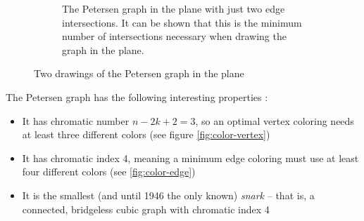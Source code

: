 \documentclass[12pt,            %
               a4paper,         %
               oneside,         %
               DIV12,           %
               fleqn,           %
               halfparskip,     %
               nochapterprefix, %
               bibtotocnumbered,%
              ]{scrartcl} %
\theoremstyle{definition}
\begin{document}
\begin{figure}[p]
\begin{subfigure}[t]{.45\textwidth}
    \caption{The Petersen graph in the plane with just two edge
      intersections. It can be shown that this is the minimum number of
      intersections necessary when drawing the graph in the plane.}
    \label{fig:petersen-twointersect}
  \end{subfigure}
  \caption{Two drawings of the Petersen graph in the plane}
\end{figure}

The Petersen graph has the following interesting properties \cite{petersen}:

\begin{itemize}
  \item It has chromatic number $n - 2k + 2 = 3$, so an optimal vertex
    coloring needs at least three different colors (see figure
    \ref{fig:color-vertex})
  \item It has chromatic index 4, meaning a minimum edge coloring must
    use at least four different colors (see \ref{fig:color-edge})
  \item It is the smallest (and until 1946 the only known)
    \emph{snark} -- that is, a connected, bridgeless cubic graph with
    chromatic index 4
\end{itemize}
\end{document}

